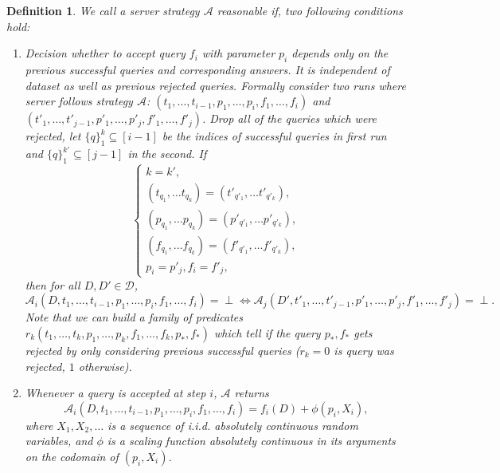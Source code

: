 \documentclass[12pt,letterpaper]{article}
\newtheorem{definition}{Definition}
\begin{document}
\begin{definition}
We call a server strategy $\mathcal{A}$ reasonable if, two following conditions hold:
\begin{enumerate}
\item Decision whether to accept query $f_i$ with parameter $p_i$ depends only on the previous successful queries and corresponding answers. It is independent of dataset as well as previous rejected queries. Formally consider two runs where server follows strategy $\mathcal{A}$: $(t_{1}, \ldots, t_{i - 1}, p_{1}, \ldots, p_{i}, f_{1}, \ldots, f_{i})$ and $(t'_{1}, \ldots, t'_{j - 1}, p'_{1}, \ldots, p'_{j}, f'_{1}, \ldots, f'_{j})$. Drop all of the queries which were rejected, let $\{q\}_{1}^{k}\subseteq[i - 1]$ be the indices of successful queries in first run and $\{q\}_{1}^{k'}\subseteq[j - 1]$ in the second. If 
\[\begin{cases}
k = k',\\ (t_{q_1}, \ldots t_{q_k}) = (t'_{q'_1}, \ldots t'_{q'_k}),\\ (p_{q_1}, \ldots p_{q_k}) = (p'_{q'_1}, \ldots p'_{q'_k}),\\ (f_{q_1}, \ldots f_{q_k}) = (f'_{q'_1}, \ldots f'_{q'_k}),\\ p_i = p'_{j}, f_i = f'_j,
\end{cases}\]
then for all $D, D' \in \mathcal{D}$,
$$\mathcal{A}_i(D, t_1, \ldots, t_{i - 1}, p_1, \ldots, p_i, f_1, \ldots, f_{i}) = \perp \Leftrightarrow \mathcal{A}_j(D', t'_1, \ldots, t'_{j - 1}, p'_1, \ldots, p'_j, f'_1, \ldots, f'_{j}) = \perp.$$
Note that we can build a family of predicates $r_{k}(t_1, \ldots, t_{k}, p_1, \ldots, p_k, f_1, \ldots, f_k, p_*, f_*)$  which tell if the query $p_*, f_*$ gets rejected by only considering previous successful queries ($r_k = 0$ is query was rejected, $1$ otherwise).
\item Whenever a query is accepted at step $i$, $\mathcal{A}$ returns
\[
  \mathcal{A}_i(D, t_1,\ldots,t_{i-1}, p_1, \ldots, p_i, f_1, \ldots, f_i) = f_i(D) + \phi(p_i, X_i),
\]
where $X_1,X_2,\ldots$ is a sequence of i.i.d. absolutely continuous random variables, and $\phi$ is a scaling function absolutely continuous in its arguments on the codomain of $(p_i,X_i)$.
\end{enumerate}
\end{definition}
\end{document}
